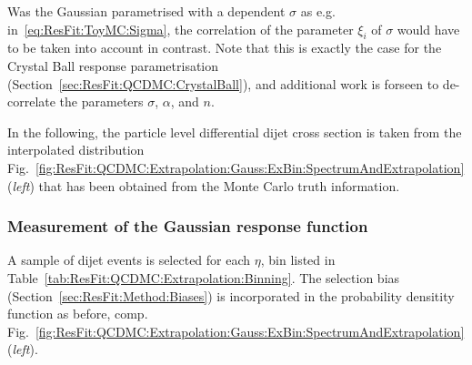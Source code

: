 Was the Gaussian parametrised with a \pt dependent $\sigma$ as e.g. in~\eqref{eq:ResFit:ToyMC:Sigma}, the correlation of the parameter $\xi_{i}$ of $\sigma$ would have to be taken into account in contrast.
Note that this is exactly the case for the Crystal Ball response parametrisation (Section~\ref{sec:ResFit:QCDMC:CrystalBall}), and additional work is forseen to de-correlate the parameters $\sigma$, $\alpha$, and $n$.

In the following, the particle level differential dijet cross section is taken from the interpolated \ptparticle distribution Fig.~\ref{fig:ResFit:QCDMC:Extrapolation:Gauss:ExBin:SpectrumAndExtrapolation} (\textit{left}) that has been obtained from the Monte Carlo truth information. 



\subsubsection{Measurement of the Gaussian response function}\label{sec:ResFit:QCDMC:Gauss}

A sample of dijet events is selected for each $\eta$, \pt bin listed in Table~\ref{tab:ResFit:QCDMC:Extrapolation:Binning}.
The selection bias (Section~\ref{sec:ResFit:Method:Biases}) is incorporated in the probability densitity function as before, comp. Fig.~\ref{fig:ResFit:QCDMC:Extrapolation:Gauss:ExBin:SpectrumAndExtrapolation} (\textit{left}).

